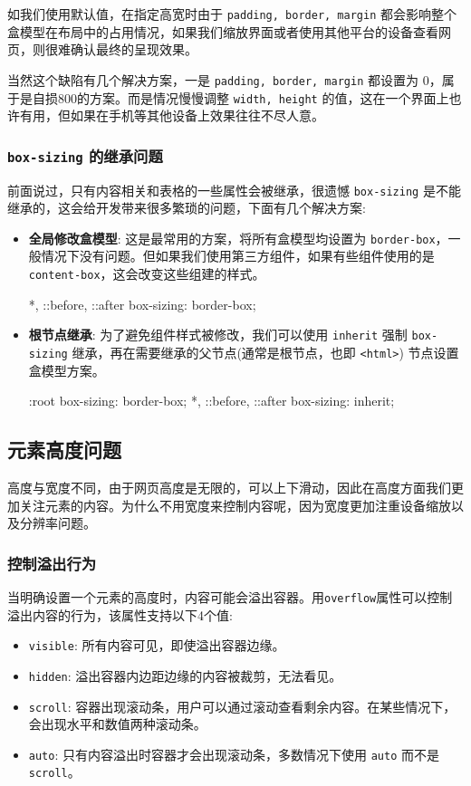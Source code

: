 如我们使用默认值，在指定高宽时由于 \texttt{padding, border, margin} 都会影响整个盒模型在布局中的占用情况，如果我们缩放界面或者使用其他平台的设备查看网页，则很难确认最终的呈现效果。

当然这个缺陷有几个解决方案，一是  \texttt{padding, border, margin} 都设置为 0，属于是自损800的方案。而是情况慢慢调整 \texttt{width, height} 的值，这在一个界面上也许有用，但如果在手机等其他设备上效果往往不尽人意。

\subsubsection*{\texttt{box-sizing} 的继承问题}

前面说过，只有内容相关和表格的一些属性会被继承，很遗憾 \texttt{box-sizing} 是不能继承的，这会给开发带来很多繁琐的问题，下面有几个解决方案:

\begin{itemize}
    \item \textbf{全局修改盒模型}: 这是最常用的方案，将所有盒模型均设置为 \texttt{border-box}，一般情况下没有问题。但如果我们使用第三方组件，如果有些组件使用的是 \texttt{content-box}，这会改变这些组建的样式。
\begin{HTML}
*, ::before, ::after {   
    box-sizing: border-box;
} 
\end{HTML}
    \item \textbf{根节点继承}: 为了避免组件样式被修改，我们可以使用 \texttt{inherit} 强制 \texttt{box-sizing} 继承，再在需要继承的父节点(通常是根节点，也即 \texttt{<html>}) 节点设置盒模型方案。
\begin{HTML}
:root {  
    box-sizing: border-box;
} 
*, ::before, ::after {   
    box-sizing: inherit;
} 
\end{HTML}
\end{itemize}

\subsection{元素高度问题}

高度与宽度不同，由于网页高度是无限的，可以上下滑动，因此在高度方面我们更加关注元素的内容。为什么不用宽度来控制内容呢，因为宽度更加注重设备缩放以及分辨率问题。

\subsubsection*{控制溢出行为}

当明确设置一个元素的高度时，内容可能会溢出容器。用\texttt{overflow}属性可以控制溢出内容的行为，该属性支持以下4个值:
\begin{itemize}
    \item \texttt{visible}: 所有内容可见，即使溢出容器边缘。
    \item \texttt{hidden}: 溢出容器内边距边缘的内容被裁剪，无法看见。
    \item \texttt{scroll}: 容器出现滚动条，用户可以通过滚动查看剩余内容。在某些情况下，会出现水平和数值两种滚动条。
    \item \texttt{auto}: 只有内容溢出时容器才会出现滚动条，多数情况下使用 \texttt{auto} 而不是 \texttt{scroll}。
\end{itemize}

